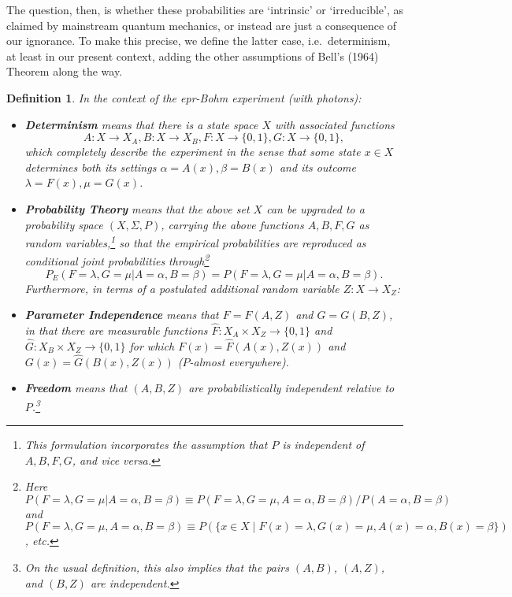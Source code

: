 \documentclass[12pt]{article}
\newtheorem{Definition}{Definition}[section]
\newcommand{\epr}{{\sc epr}}
\newcommand{\qm}{quantum mechanics}
\newcommand{\raw}{\rightarrow} \newcommand{\rat}{\mapsto}
\newcommand{\x}{\times} \newcommand{\hb}{\hbar}
\newcommand{\al}{\alpha} \newcommand{\bt}{L\beta}
\newcommand{\lm}{\lambda} \newcommand{\Lm}{\Lambda}
\newcommand{\Sg}{\Sigma} \newcommand{\ta}{\tau} \newcommand{\ph}{\phi}
\begin{document}
The question, then, is whether these probabilities are `intrinsic' or `irreducible', as claimed by mainstream \qm, or instead are just a consequence of our ignorance. To make this precise, we  define the latter case, i.e.\ determinism, at least in our present context, adding the other assumptions of Bell's (1964) Theorem along the way.
\begin{Definition}\label{Belldefs}
In the context of the  \epr-Bohm experiment (with photons):
\begin{itemize}
\item 
\textbf{Determinism} means that there is a state space $X$  with associated functions 
\begin{equation}
A: X\raw X_A, B:X\raw X_B, F:X\raw\{0,1\}, G:X\raw\{0,1\},\label{ABFG}
\end{equation}
which completely describe the experiment in the sense that some state $x\in X$ determines \emph{both} its settings $\al=A(x),\beta=B(x)$ \emph{and} its outcome $\lm=F(x),\mu=G(x)$. 
\item
\textbf{Probability Theory} means that the above set $X$ can be upgraded to a probability space $(X,\Sg,P)$, carrying the above functions $A,B,F,G$ as random variables,\footnote{This formulation incorporates the assumption that $P$ is independent of $A,B,F,G$, and \emph{vice versa}. }
 so that the empirical  probabilities are reproduced as conditional joint probabilities through\footnote{Here 
$P(F=\lm,G=\mu|A=\al,B=\beta)\equiv P(F=\lm,G=\mu,A=\al,B=\beta)/P(A=\al,B=\beta)$ and 
$P(F=\lm,G=\mu,A=\al,B=\beta)\equiv P(\{x\in X\mid F(x)=\lm,G(x)=\mu,A(x)=\al,B(x)=\beta\})$, etc.}
\begin{equation}
P_E(F=\lm,G=\mu|A=\al,B=\beta)= P(F=\lm,G=\mu|A=\al,B=\beta). \label{PEP}
\end{equation}
Furthermore, in terms of a postulated additional random variable $Z:X\raw X_Z$:
\item \textbf{Parameter Independence}  means   that
$F=F(A,Z)$ and $G=G(B,Z)$,
 in  that there are measurable functions $\hat{F}:X_A \x X_Z\raw \{0,1\}$ and $\hat{G}:X_B\x X_Z\raw \{0,1\}$
  for which  $F(x)=\hat{F}(A(x),Z(x))$ and $G(x)=\hat{G}(B(x),Z(x))$ ($P$-almost everywhere).
\item \textbf{Freedom} means that
 $(A,B,Z)$ are probabilistically independent relative to  $P$.\footnote{On the usual definition, this also implies that the pairs $(A,B)$, $(A,Z)$, and $(B,Z)$ are independent.}
\end{itemize}
\end{Definition}
\end{document}
